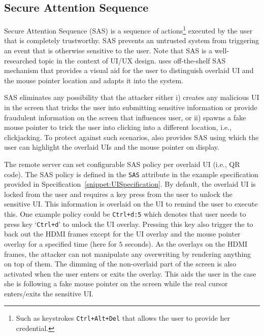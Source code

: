 \subsection{Secure Attention Sequence}
\label{sec:systemDesign:SAS}

Secure Attention Sequence (SAS) is a sequence of actions\footnote{Such as keystrokes \texttt{Ctrl+Alt+Del} that allows the user to provide her credential.} executed by the user that is completely trustworthy. SAS prevents an untrusted system from triggering an event that is otherwise sensitive to the user. Note that SAS is a well-researched topic in the context of UI/UX design. \name uses off-the-shelf SAS mechanism that provides a visual aid for the user to distinguish overlaid UI and the mouse pointer location and adapts it into the system. 

SAS eliminates any possibility that the attacker either i) creates any malicious UI in the screen that tricks the user into submitting sensitive information or provide fraudulent information on the screen that influences user, or ii) spawns a fake mouse pointer to trick the user into clicking into a different location, i.e., clickjacking. To protect against such scenarios, \device also provides SAS using which the user can highlight the overlaid UIs and the mouse pointer on display. 


 The remote server can set configurable SAS policy per overlaid UI (i.e., QR code). The SAS policy is defined in the \texttt{SAS} attribute in the example specification provided in Specification~\ref{snippet:UISpecification}. By default, the overlaid UI is locked from the user and requires a key press from the user to unlock the sensitive UI. This information is overlaid on the UI to remind the user to execute this. One example policy could be \texttt{Ctrl+d:5} which denotes that user needs to press key `\texttt{Ctrl+d}' to unlock the UI overlay. Pressing this key also trigger the \device to back out the HDMI frames except for the UI overlay and the mouse pointer overlay for a specified time (here for $5$ seconds). As the \device overlays on the HDMI frames, the attacker can not manipulate any overwriting by rendering anything on top of them. The dimming of the non-overlaid part of the screen is also activated when the user enters or exits the overlay. This aids the user in the case she is following a fake mouse pointer on the screen while the real cursor enters/exits the sensitive UI.

